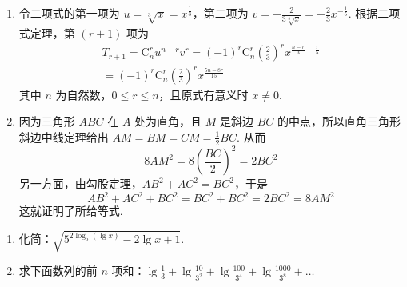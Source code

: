 \begin{solution}
\begin{enumerate}
\item 令二项式的第一项为 \(u=\sqrt[3]{x}=x^{\frac{1}{3}}\)，第二项为 \(v=-\frac{2}{3\sqrt[5]{x}}=-\frac{2}{3}x^{-\frac{1}{5}}\). 根据二项式定理，第 \(\left(r+1\right)\) 项为
\[
\begin{gathered}
T_{r+1}=\mathrm C_n^r u^{n-r}v^r
=\left(-1\right)^r\mathrm C_n^r\left(\frac{2}{3}\right)^r x^{\frac{n-r}{3}-\frac{r}{5}} \\
=\left(-1\right)^r\mathrm C_n^r\left(\frac{2}{3}\right)^r x^{\frac{5n-8r}{15}}
\end{gathered}
\]
其中 \(n\) 为自然数，\(0\leqslant r\leqslant n\)，且原式有意义时 \(x\neq0\).

\item 因为三角形 \(ABC\) 在 \(A\) 处为直角，且 \(M\) 是斜边 \(BC\) 的中点，所以直角三角形斜边中线定理给出 \(AM=BM=CM=\frac{1}{2}BC\). 从而
\[
8AM^2=8\left(\frac{BC}{2}\right)^2=2BC^2
\]
另一方面，由勾股定理，\(AB^2+AC^2=BC^2\)，于是
\[
AB^2+AC^2+BC^2=BC^2+BC^2=2BC^2=8AM^2
\]
这就证明了所给等式.
\end{enumerate}
\end{solution}

\begin{problem}
\begin{enumerate}
    \item 化简：\(\sqrt{5^{2\log_5\left( \lg x \right)}-2\lg x+1}\).
    \item 求下面数列的前 \(n\) 项和：\(\lg\frac{1}{3}+\lg\frac{10}{3^2}+\lg\frac{100}{3^4}+\lg\frac{1000}{3^8}+\dots\)
\end{enumerate}
\end{problem}

